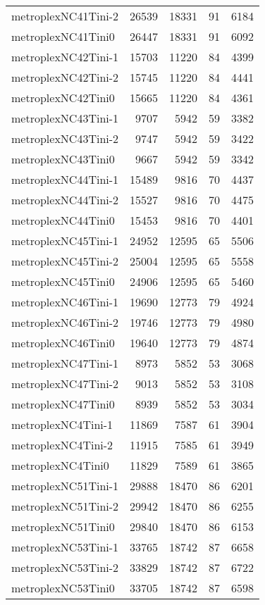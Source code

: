 \begin{longtable}{lrrrr}
metroplexNC41Tini-2 & 26539 & 18331 & 91 & 6184 \\
metroplexNC41Tini0 & 26447 & 18331 & 91 & 6092 \\
metroplexNC42Tini-1 & 15703 & 11220 & 84 & 4399 \\
metroplexNC42Tini-2 & 15745 & 11220 & 84 & 4441 \\
metroplexNC42Tini0 & 15665 & 11220 & 84 & 4361 \\
metroplexNC43Tini-1 & 9707 & 5942 & 59 & 3382 \\
metroplexNC43Tini-2 & 9747 & 5942 & 59 & 3422 \\
metroplexNC43Tini0 & 9667 & 5942 & 59 & 3342 \\
metroplexNC44Tini-1 & 15489 & 9816 & 70 & 4437 \\
metroplexNC44Tini-2 & 15527 & 9816 & 70 & 4475 \\
metroplexNC44Tini0 & 15453 & 9816 & 70 & 4401 \\
metroplexNC45Tini-1 & 24952 & 12595 & 65 & 5506 \\
metroplexNC45Tini-2 & 25004 & 12595 & 65 & 5558 \\
metroplexNC45Tini0 & 24906 & 12595 & 65 & 5460 \\
metroplexNC46Tini-1 & 19690 & 12773 & 79 & 4924 \\
metroplexNC46Tini-2 & 19746 & 12773 & 79 & 4980 \\
metroplexNC46Tini0 & 19640 & 12773 & 79 & 4874 \\
metroplexNC47Tini-1 & 8973 & 5852 & 53 & 3068 \\
metroplexNC47Tini-2 & 9013 & 5852 & 53 & 3108 \\
metroplexNC47Tini0 & 8939 & 5852 & 53 & 3034 \\
metroplexNC4Tini-1 & 11869 & 7587 & 61 & 3904 \\
metroplexNC4Tini-2 & 11915 & 7585 & 61 & 3949 \\
metroplexNC4Tini0 & 11829 & 7589 & 61 & 3865 \\
metroplexNC51Tini-1 & 29888 & 18470 & 86 & 6201 \\
metroplexNC51Tini-2 & 29942 & 18470 & 86 & 6255 \\
metroplexNC51Tini0 & 29840 & 18470 & 86 & 6153 \\
metroplexNC53Tini-1 & 33765 & 18742 & 87 & 6658 \\
metroplexNC53Tini-2 & 33829 & 18742 & 87 & 6722 \\
metroplexNC53Tini0 & 33705 & 18742 & 87 & 6598 \\

\end{longtable}
